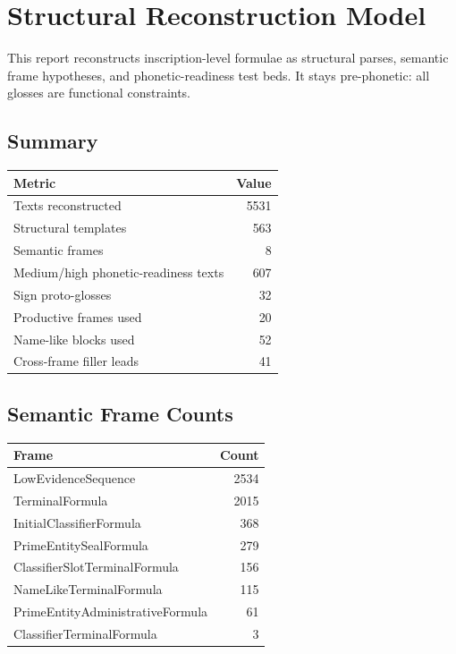 \documentclass[11pt,a4paper]{article}
\begin{document}
\section*{Structural Reconstruction Model}
This report reconstructs inscription-level formulae as structural parses, semantic frame hypotheses, and phonetic-readiness test beds. It stays pre-phonetic: all glosses are functional constraints.
\subsection*{Summary}
\begin{center}
\begin{tabular}{lr}
\toprule
\textbf{Metric} & \textbf{Value} \\
\midrule
Texts reconstructed & 5531 \\
Structural templates & 563 \\
Semantic frames & 8 \\
Medium/high phonetic-readiness texts & 607 \\
Sign proto-glosses & 32 \\
Productive frames used & 20 \\
Name-like blocks used & 52 \\
Cross-frame filler leads & 41 \\
\bottomrule
\end{tabular}
\end{center}
\subsection*{Semantic Frame Counts}
\begin{center}
\begin{tabular}{lr}
\toprule
\textbf{Frame} & \textbf{Count} \\
\midrule
LowEvidenceSequence & 2534 \\
TerminalFormula & 2015 \\
InitialClassifierFormula & 368 \\
PrimeEntitySealFormula & 279 \\
ClassifierSlotTerminalFormula & 156 \\
NameLikeTerminalFormula & 115 \\
PrimeEntityAdministrativeFormula & 61 \\
ClassifierTerminalFormula & 3 \\
\bottomrule
\end{tabular}
\end{center}
\end{document}
